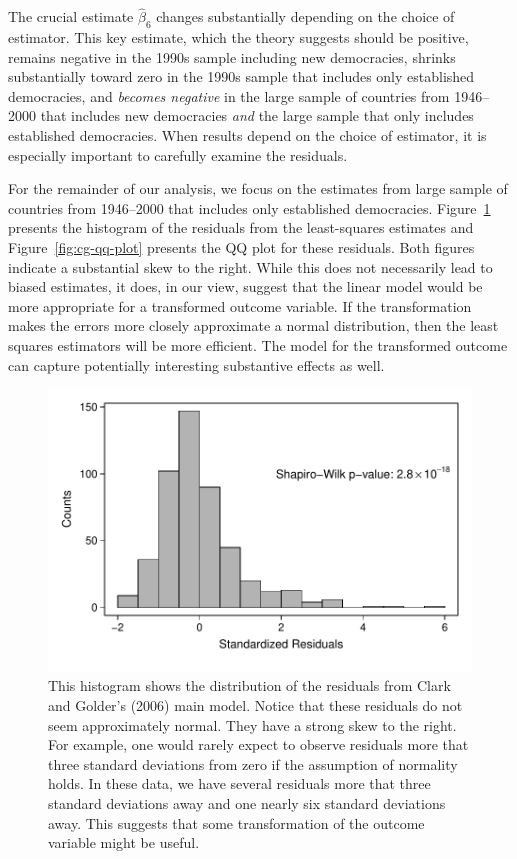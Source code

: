 \documentclass[12pt]{article}
\begin{document}
The crucial estimate $\hat{\beta}_6$ changes substantially depending on the choice of estimator. 
This key estimate, which the theory suggests should be positive, remains negative in the 1990s sample including new democracies, shrinks substantially toward zero in the 1990s sample that includes only established democracies, and \textit{becomes negative} in the large sample of countries from 1946--2000 that includes new democracies \textit{and} the large sample that only includes established democracies. 
When results depend on the choice of estimator, it is especially important to carefully examine the residuals.

For the remainder of our analysis, we focus on the estimates from large sample of countries from 1946--2000 that includes only established democracies. 
Figure~\ref{fig:cg-residuals-hist} presents the histogram of the residuals from the least-squares estimates and Figure~\ref{fig:cg-qq-plot} presents the QQ plot for these residuals. 
Both figures indicate a substantial skew to the right. 
While this does not necessarily lead to biased estimates, it does, in our view, suggest that the linear model would be more appropriate for a transformed outcome variable. 
If the transformation makes the errors more closely approximate a normal distribution, then the least squares estimators will be more efficient. 
The model for the transformed outcome can capture potentially interesting substantive effects as well.

\begin{figure}[h!]
\begin{center}
\includegraphics[scale = 0.6]{figs/cg-residuals-hist.pdf}
\caption{This histogram shows the distribution of the residuals from Clark and Golder's (2006) main model. 
Notice that these residuals do not seem approximately normal. They have a strong skew to the right. 
For example, one would rarely expect to observe residuals more that three standard deviations from zero if the assumption of normality holds. 
In these data, we have several residuals more that three standard deviations away and one nearly six standard deviations away. 
This suggests that some transformation of the outcome variable might be useful.}\label{fig:cg-residuals-hist}	
\end{center}
\end{figure}
\end{document}
